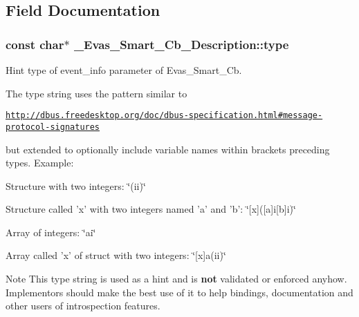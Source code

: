 \subsection{Field Documentation}
\subsubsection[{type}]{\setlength{\rightskip}{0pt plus 5cm}const char$\ast$ {\bf \_\-Evas\_\-Smart\_\-Cb\_\-Description::type}}\label{struct__Evas__Smart__Cb__Description_af0d4ce3d62a068eab1b89a34abb056ad}


Hint type of {\ttfamily event\_\-info} parameter of Evas\_\-Smart\_\-Cb. 

The type string uses the pattern similar to

\href{http://dbus.freedesktop.org/doc/dbus-specification.html#message-protocol-signatures}{\tt http://dbus.freedesktop.org/doc/dbus-\/specification.html\#message-\/protocol-\/signatures}

but extended to optionally include variable names within brackets preceding types. Example:

\begin{DoxyItemize}
\item Structure with two integers: {\ttfamily \char`\"{}(ii)\char`\"{}} \end{DoxyItemize}
\begin{DoxyItemize}
\item Structure called 'x' with two integers named 'a' and 'b': {\ttfamily \char`\"{}\mbox{[}x\mbox{]}(\mbox{[}a\mbox{]}i\mbox{[}b\mbox{]}i)\char`\"{}} \end{DoxyItemize}
\begin{DoxyItemize}
\item Array of integers: {\ttfamily \char`\"{}ai\char`\"{}} \end{DoxyItemize}
\begin{DoxyItemize}
\item Array called 'x' of struct with two integers: {\ttfamily \char`\"{}\mbox{[}x\mbox{]}a(ii)\char`\"{}} \end{DoxyItemize}
\begin{DoxyNote}{Note}
This type string is used as a hint and is {\bfseries not} validated or enforced anyhow. Implementors should make the best use of it to help bindings, documentation and other users of introspection features. 
\end{DoxyNote}
